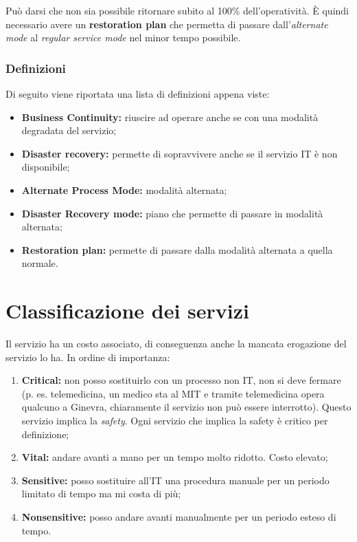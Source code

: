 Può darsi che non sia possibile ritornare subito al 100\% dell'operatività.
È quindi necessario avere un \textbf{restoration plan} che permetta di passare
dall'\textit{alternate mode} al \textit{regular service mode} nel minor tempo
possibile.

\subsubsection{Definizioni}

Di seguito viene riportata una lista di definizioni appena viste:

\begin{itemize}
  \item \textbf{Business Continuity:} riuscire ad operare anche se con una
  modalità degradata del servizio;
  \item \textbf{Disaster recovery:} permette di sopravvivere anche se il
  servizio IT è non disponibile;
  \item \textbf{Alternate Process Mode:} modalità alternata;
  \item \textbf{Disaster Recovery mode:} piano che permette di passare in
  modalità alternata;
  \item \textbf{Restoration plan:} permette di passare dalla modalità alternata
  a quella normale.
\end{itemize}

\section{Classificazione dei servizi}\label{sec:classificazioneServizi}

Il servizio ha un costo associato, di conseguenza anche la mancata erogazione
del servizio lo ha. In ordine di importanza:
\begin{enumerate}
 \item \textbf{Critical:} non posso sostituirlo con un processo non IT, non si
deve fermare (p. es. telemedicina, un medico sta al MIT e tramite telemedicina
opera qualcuno a Ginevra, chiaramente il servizio non può essere interrotto).
Questo servizio implica la \textit{safety}. Ogni servizio che
implica la safety è critico per definizione;
 \item \textbf{Vital:} andare avanti a mano per un tempo molto ridotto. Costo
elevato;
 \item \textbf{Sensitive:} posso sostituire all'IT una procedura manuale per un
periodo limitato di tempo ma mi costa di più;

 \item \textbf{Nonsensitive:} posso andare avanti manualmente per un periodo
esteso di tempo.

\end{enumerate}

